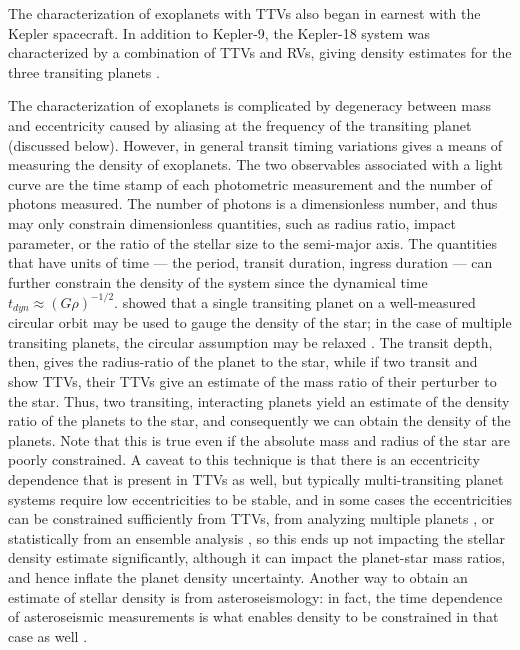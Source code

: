 \documentclass[graybox,natbib,nosecnum]{svmult}
\begin{document}
The characterization of exoplanets with TTVs also began in earnest with the Kepler spacecraft.
In addition to Kepler-9, the Kepler-18 system was characterized by a combination of TTVs and
RVs, giving density estimates for the three transiting planets \citep{2011ApJS..197....7C}.

The characterization of exoplanets is complicated by degeneracy between mass and eccentricity
caused by aliasing at the frequency of the transiting planet (discussed below).  However,
in general transit timing variations gives a means of measuring the density of exoplanets.
The two observables associated with a light curve are the time stamp of each photometric
measurement and the number of photons measured.  The number of photons is a dimensionless
number, and thus may only constrain dimensionless quantities, such as radius ratio, impact 
parameter, or the ratio of the stellar size to the semi-major axis.  The quantities that 
have units of time --- the period, transit duration, ingress duration ---  can further
constrain the density of the system since the dynamical time $t_{dyn} \approx
(G\rho)^{-1/2}$.  \citet{2003ApJ...585.1038S} showed that a single transiting planet
on a well-measured circular orbit may be used to gauge the density of the star;
in the case of multiple transiting planets, the circular assumption may be relaxed
\citep{2014MNRAS.440.2164K}.
The transit depth, then, gives the radius-ratio of the planet to the star, while if two
transit and show TTVs, their TTVs give an estimate of the mass ratio of their perturber
to the star.  Thus, two transiting, interacting planets yield an estimate of the density ratio of
the planets to the star, and consequently we can obtain the density of the planets.
Note that this is true even if the absolute mass and radius of the star are poorly
constrained.  A caveat to this technique is that there is an eccentricity dependence that 
is present in TTVs as well,
but typically multi-transiting planet systems require low eccentricities to be stable,
and in some cases the eccentricities can be constrained sufficiently from TTVs, from
analyzing multiple planets \citep{2014MNRAS.440.2164K}, or
statistically from an ensemble analysis \citep{2014ApJ...787...80H}, so this ends up not impacting the stellar density 
estimate significantly, although it can impact the planet-star mass ratios, and
hence inflate the planet density uncertainty.
Another way to obtain an estimate of stellar density is from asteroseismology:
in fact, the time dependence of asteroseismic measurements is what enables density
to be constrained in that case as well \citep{1986ApJ...306L..37U}.
\end{document}
